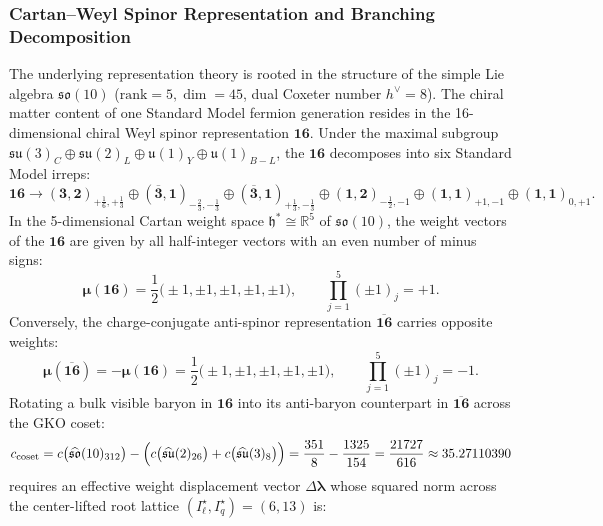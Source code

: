 \documentclass[11pt,onecolumn]{article}
\begin{document}
\subsubsection{Cartan--Weyl Spinor Representation and Branching Decomposition}
The underlying representation theory is rooted in the structure of the simple Lie algebra $\mathfrak{so}(10)$ ($\mathrm{rank} = 5, \dim = 45$, dual Coxeter number $h^\vee = 8$). The chiral matter content of one Standard Model fermion generation resides in the 16-dimensional chiral Weyl spinor representation $\mathbf{16}$. Under the maximal subgroup $\mathfrak{su}(3)_C \oplus \mathfrak{su}(2)_L \oplus \mathfrak{u}(1)_Y \oplus \mathfrak{u}(1)_{B-L}$, the $\mathbf{16}$ decomposes into six Standard Model irreps:
\begin{equation}
\mathbf{16} \longrightarrow (\mathbf{3}, \mathbf{2})_{+\frac{1}{6}, +\frac{1}{3}} \oplus (\overline{\mathbf{3}}, \mathbf{1})_{-\frac{2}{3}, -\frac{1}{3}} \oplus (\overline{\mathbf{3}}, \mathbf{1})_{+\frac{1}{3}, -\frac{1}{3}} \oplus (\mathbf{1}, \mathbf{2})_{-\frac{1}{2}, -1} \oplus (\mathbf{1}, \mathbf{1})_{+1, -1} \oplus (\mathbf{1}, \mathbf{1})_{0, +1}.
\label{eq:so10_branching}
\end{equation}
In the 5-dimensional Cartan weight space $\mathfrak{h}^\ast \cong \mathbb{R}^5$ of $\mathfrak{so}(10)$, the weight vectors of the $\mathbf{16}$ are given by all half-integer vectors with an even number of minus signs:
\begin{equation}
\bm{\mu}(\mathbf{16}) = \frac{1}{2}\bigl(\pm 1, \pm 1, \pm 1, \pm 1, \pm 1\bigr), \qquad \prod_{j=1}^5 (\pm 1)_j = +1.
\end{equation}
Conversely, the charge-conjugate anti-spinor representation $\overline{\mathbf{16}}$ carries opposite weights:
\begin{equation}
\bm{\mu}(\overline{\mathbf{16}}) = -\bm{\mu}(\mathbf{16}) = \frac{1}{2}\bigl(\pm 1, \pm 1, \pm 1, \pm 1, \pm 1\bigr), \qquad \prod_{j=1}^5 (\pm 1)_j = -1.
\end{equation}
Rotating a bulk visible baryon in $\mathbf{16}$ into its anti-baryon counterpart in $\overline{\mathbf{16}}$ across the GKO coset:
\begin{equation}
c_{\text{coset}} = c\bigl(\widehat{\mathfrak{so}}(10)_{312}\bigr) - \Bigl(c\bigl(\widehat{\mathfrak{su}}(2)_{26}\bigr) + c\bigl(\widehat{\mathfrak{su}}(3)_8\bigr)\Bigr) = \frac{351}{8} - \frac{1325}{154} = \frac{21727}{616} \approx 35.27110390
\label{eq:coset_central_charge}
\end{equation}
requires an effective weight displacement vector $\Delta\bm{\lambda}$ whose squared norm across the center-lifted root lattice $(I_\ell^\star, I_q^\star) = (6, 13)$ is:
\end{document}

